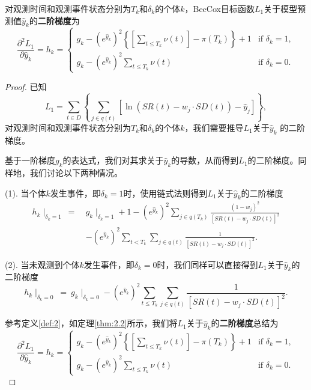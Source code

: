 \begin{theorem}\label{thm:2.2}
对观测时间和观测事件状态分别为$T_k$和$\delta_k$的个体$k$，BecCox目标函数$L_1$关于模型预测值$\hat{y}_k$的\textbf{二阶梯度}为$$
\frac{\partial^2 L_1}{\partial \hat{y}_k} = h_k = 
\begin{cases}
g_k - (e^{\hat{y}_k})^2 \left\{ \left[\sum_{t\le T_k} \nu(t)\right] - \pi(T_k) \right\} + 1 & \text{if } \delta_k = 1,\\
g_k - (e^{\hat{y}_k})^2 \sum_{t\le T_k} \nu(t) & \text{if } \delta_k = 0.
\end{cases}
$$
\end{theorem}

\begin{proof}
已知$$L_1 = \sum_{t\in D} \left\{ \sum_{j\in q(t)} [\ln(SR(t)-w_j\cdot SD(t))-\hat{y}_j] \right\},$$ 对观测时间和观测事件状态分别为$T_k$和$\delta_k$的个体$k$，我们需要推导$L_1$关于$\hat{y}_k$ 的二阶梯度。

基于一阶梯度$g_k$的表达式，我们对其求关于$\hat{y}_k$的导数，从而得到$L_1$的二阶梯度。同样地，我们讨论以下两种情况。

(1). 当个体$k$发生事件，即$\delta_k=1$时，使用链式法则得到$L_1$关于$\hat{y}_k$的二阶梯度\[
\begin{split}
h_k\mid_{\delta_k=1}\ =\ & g_k\mid_{\delta_k=1} + 1 - (e^{\hat{y}_k})^2 \sum_{j\in q(T_k)} \frac{(1-w_j)^2}{[SR(t) - w_j\cdot SD(t)]^2} \\
   & -(e^{\hat{y}_k})^2 \sum_{t< T_k} \sum_{j\in q(t)} \frac{1}{[SR(t) - w_j\cdot SD(t)]^2}.
\end{split}
\]

(2). 当未观测到个体$k$发生事件，即$\delta_k=0$时，我们同样可以直接得到$L_1$关于$\hat{y}_k$的二阶梯度$$
h_k\mid_{\delta_k=0}\ =\ g_k\mid_{\delta_k=0} - (e^{\hat{y}_k})^2 \sum_{t\le T_k} \sum_{j\in q(t)} \frac{1}{[SR(t) - w_j\cdot SD(t)]^2}.
$$

参考定义\ref{def:2}，如定理\ref{thm:2.2}所示，我们将$L_1$关于$\hat{y}_k$的\textbf{二阶梯度}总结为$$
\frac{\partial^2 L_1}{\partial \hat{y}_k} = h_k = 
\begin{cases}
g_k - (e^{\hat{y}_k})^2 \left\{ \left[\sum_{t\le T_k} \nu(t)\right] - \pi(T_k) \right\} + 1 & \text{if } \delta_k = 1,\\
g_k - (e^{\hat{y}_k})^2 \sum_{t\le T_k} \nu(t) & \text{if } \delta_k = 0.
\end{cases}
$$
\end{proof}

